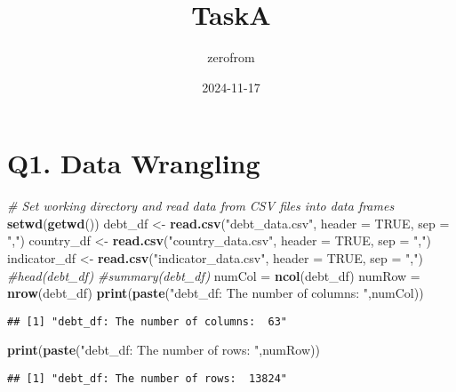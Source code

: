 \documentclass[
]{article}
\title{TaskA}
\author{zerofrom}
\date{2024-11-17}
\newenvironment{Shaded}{\begin{snugshade}}{\end{snugshade}}
\newcommand{\AttributeTok}[1]{\textcolor[rgb]{0.13,0.29,0.53}{#1}}
\newcommand{\CommentTok}[1]{\textcolor[rgb]{0.56,0.35,0.01}{\textit{#1}}}
\newcommand{\ConstantTok}[1]{\textcolor[rgb]{0.56,0.35,0.01}{#1}}
\newcommand{\FunctionTok}[1]{\textcolor[rgb]{0.13,0.29,0.53}{\textbf{#1}}}
\newcommand{\NormalTok}[1]{#1}
\newcommand{\OtherTok}[1]{\textcolor[rgb]{0.56,0.35,0.01}{#1}}
\newcommand{\StringTok}[1]{\textcolor[rgb]{0.31,0.60,0.02}{#1}}
\begin{document}
\maketitle

\section{Q1. Data Wrangling}\label{q1.-data-wrangling}

\begin{Shaded}
\begin{Highlighting}[]
\CommentTok{\# Set working directory and read data from CSV files into data frames}
\FunctionTok{setwd}\NormalTok{(}\FunctionTok{getwd}\NormalTok{())}
\NormalTok{debt\_df }\OtherTok{\textless{}{-}} \FunctionTok{read.csv}\NormalTok{(}\StringTok{"debt\_data.csv"}\NormalTok{, }\AttributeTok{header =} \ConstantTok{TRUE}\NormalTok{, }\AttributeTok{sep =} \StringTok{","}\NormalTok{)}
\NormalTok{country\_df }\OtherTok{\textless{}{-}} \FunctionTok{read.csv}\NormalTok{(}\StringTok{"country\_data.csv"}\NormalTok{, }\AttributeTok{header =} \ConstantTok{TRUE}\NormalTok{, }\AttributeTok{sep =} \StringTok{","}\NormalTok{)}
\NormalTok{indicator\_df }\OtherTok{\textless{}{-}} \FunctionTok{read.csv}\NormalTok{(}\StringTok{"indicator\_data.csv"}\NormalTok{, }\AttributeTok{header =} \ConstantTok{TRUE}\NormalTok{, }\AttributeTok{sep =} \StringTok{","}\NormalTok{)}
\CommentTok{\#head(debt\_df)}
\CommentTok{\#summary(debt\_df)}
\NormalTok{numCol }\OtherTok{=} \FunctionTok{ncol}\NormalTok{(debt\_df)}
\NormalTok{numRow }\OtherTok{=} \FunctionTok{nrow}\NormalTok{(debt\_df)}
\FunctionTok{print}\NormalTok{(}\FunctionTok{paste}\NormalTok{(}\StringTok{"debt\_df: The number of columns: "}\NormalTok{,numCol))}
\end{Highlighting}
\end{Shaded}

\begin{verbatim}
## [1] "debt_df: The number of columns:  63"
\end{verbatim}

\begin{Shaded}
\begin{Highlighting}[]
\FunctionTok{print}\NormalTok{(}\FunctionTok{paste}\NormalTok{(}\StringTok{"debt\_df: The number of rows: "}\NormalTok{,numRow))}
\end{Highlighting}
\end{Shaded}

\begin{verbatim}
## [1] "debt_df: The number of rows:  13824"
\end{verbatim}
\end{document}
